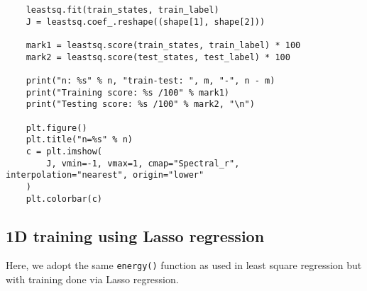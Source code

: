 \begin{verbatim}
    leastsq.fit(train_states, train_label)
    J = leastsq.coef_.reshape((shape[1], shape[2]))

    mark1 = leastsq.score(train_states, train_label) * 100
    mark2 = leastsq.score(test_states, test_label) * 100

    print("n: %s" % n, "train-test: ", m, "-", n - m)
    print("Training score: %s /100" % mark1)
    print("Testing score: %s /100" % mark2, "\n")

    plt.figure()
    plt.title("n=%s" % n)
    c = plt.imshow(
        J, vmin=-1, vmax=1, cmap="Spectral_r", interpolation="nearest", origin="lower"
    )
    plt.colorbar(c)
\end{verbatim}

\subsection{1D training using Lasso regression}

Here, we adopt the same \texttt{energy()} function as used in least square regression but with training done via Lasso regression.

